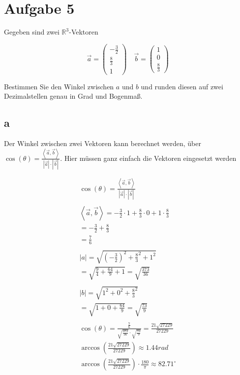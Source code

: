 \section{Aufgabe 5}

Gegeben sind zwei $\mathbb{R}^3$-Vektoren

\[
\vec{a} = \begin{pmatrix}
    -\frac{3}{2} \\
    \frac{8}{3} \\
    1
\end{pmatrix} \quad \vec{b} = \begin{pmatrix}
    1 \\ 0 \\ \frac{8}{3}
\end{pmatrix}
\]

Bestimmen Sie den Winkel zwischen $a$ und $b$ und runden diesen auf zwei Dezimalstellen genau in Grad und Bogenmaß.

\subsection{a}

Der Winkel zwischen zwei Vektoren kann berechnet werden, über $\cos(\theta) = \frac{\left\langle \vec{a}, \vec{b} \right\rangle}{\left|\vec{a}\right| \cdot \left|\vec{b}\right|}$. Hier müssen ganz einfach die Vektoren eingesetzt werden

\begin{align*}
    \cos(\theta) = \frac{\left\langle \vec{a}, \vec{b} \right\rangle}{\left|\vec{a}\right| \cdot \left|\vec{b}\right|} \\\\
    \left\langle \vec{a}, \vec{b} \right\rangle = -\frac{3}{2} \cdot 1 + \frac{8}{3} \cdot 0 + 1 \cdot \frac{8}{3} \\
    = -\frac{3}{2} + \frac{8}{3} \\
    = \frac{7}{6} \\\\
    \left|a\right| = \sqrt{{(-\frac{3}{2})}^2 + \frac{8}{3}^2 + 1^2} \\
    = \sqrt{{\frac{9}{4}} + \frac{64}{9} + 1}
    = \sqrt{\frac{373}{36}} \\\\
    \left|b\right| = \sqrt{1^2 + 0^2 + \frac{8}{3}^2} \\
    = \sqrt{1 + 0 + \frac{64}{9}}
    = \sqrt{\frac{73}{9}} \\\\
    \cos(\theta) = \frac{\frac{7}{6}}{\sqrt{\frac{373}{36}} \cdot \sqrt{\frac{73}{9}}} = \frac{21 \sqrt{27229}}{27229} \\
    \arccos\left(\frac{21 \sqrt{27229}}{27229}\right) \approx 1.44 rad \\
    \arccos\left(\frac{21 \sqrt{27229}}{27229}\right) \cdot \frac{180}{\pi} \approx 82.71^\circ
\end{align*}


